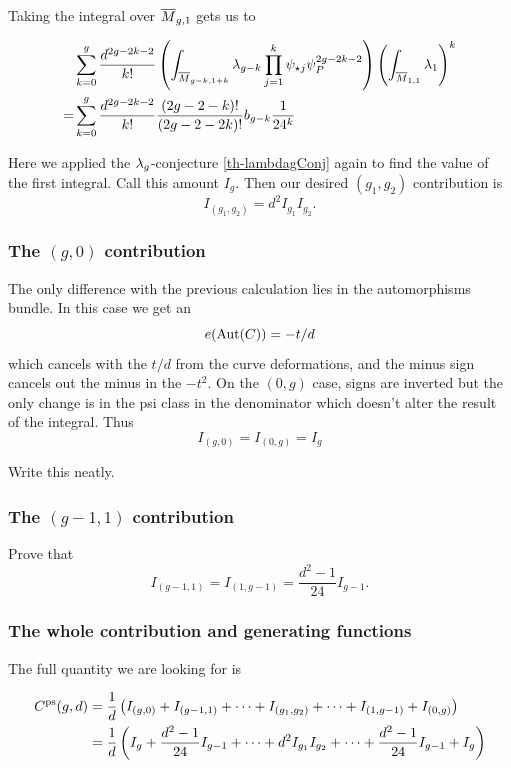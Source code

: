 \documentclass[12pt]{memoir}
\begin{document}
Taking the integral over \(\overline{M}_{g,1}\) gets us to

\begin{align*}
      & \sum_{k=0}^{g}\frac{d^{2g-2k-2}}{k!}\left(\int_{\overline{M}_{g-k,1+k}}\lambda_{g-k}\prod_{j=1}^{k}\psi_{\star j}\psi_{P}^{2g-2k-2}\right)\left(\int_{\overline{M}_{1,1}}\lambda_1\right)^k \\
    = & \sum_{k=0}^{g}\frac{d^{2g-2k-2}}{k!}\frac{(2g-2-k)!}{(2g-2-2k)!}b_{g-k}\frac{1}{24^k}
\end{align*}

Here we applied the \(\lambda_g\)-conjecture \ref{th-lambdagConj} again to find the value of the first integral. Call this amount \(I_g\). Then our desired \((g_1,g_2)\) contribution is
\[I_{(g_1,g_2)}={d^2}I_{g_1}I_{g_2}.\]

\subsubsection{The \((g,0)\) contribution}

The only difference with the previous calculation lies in the automorphisms bundle. In this case we get an
\[e(\operatorname{Aut}(C))=-t/d\]
which cancels with the \(t/d\) from the curve deformations, and the minus sign cancels out the minus in the \(-t^2\). On the \((0,g)\) case, signs are inverted but the only change is in the psi class in the denominator which doesn't alter the result of the integral. Thus
\[I_{(g,0)}=I_{(0,g)}=I_g\]

\begin{Ej}
    Write this neatly.
\end{Ej}

\subsubsection{The \((g-1,1)\) contribution}

\begin{Ej}
    Prove that
    \[    I_{(g-1,1)}=I_{(1,g-1)}=\frac{d^2-1}{24}I_{g-1}.
    \]
\end{Ej}

\subsubsection{The whole contribution and generating functions}

The full quantity we are looking for is

\begin{align*}
    C^{\operatorname{\mathrm{ps}}}(g,d) & =\frac{1}{d}\left(I_{(g,0)}+I_{(g-1,1)}+\dots+I_{(g_1,g_2)}+\dots+I_{(1,g-1)}+I_{(0,g)}\right)                   \\
                 & =\frac{1}{d}\left(I_g+\frac{d^2-1}{24}I_{g-1}+\dots+{d^2}I_{g_1}I_{g_2}+\dots+\frac{d^2-1}{24}I_{g-1}+I_g\right)
\end{align*}
\end{document}
